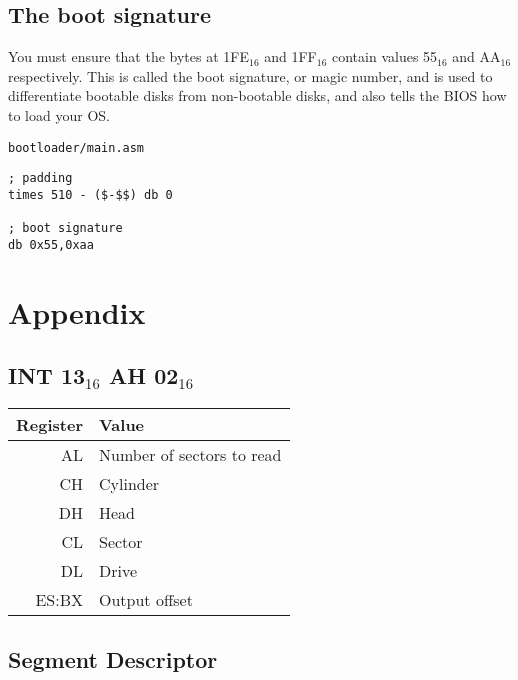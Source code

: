 \documentclass{article}
\begin{document}
\subsection{The boot signature}

You must ensure that the bytes at 1FE$_{16}$ and 1FF$_{16}$
contain values 55$_{16}$ and AA$_{16}$ respectively\cite{55aa}.
This is called the boot signature, or magic number, and is used to differentiate
bootable disks from non-bootable disks, and also tells the BIOS how to load your OS.

\begin{verbatim}
bootloader/main.asm
\end{verbatim}
\begin{verbatim}
; padding
times 510 - ($-$$) db 0

; boot signature
db 0x55,0xaa
\end{verbatim}

\newpage

\section{Appendix}
\appendix

\subsection{INT 13$_{16}$ AH 02$_{16}$}
\label{int 13 ah 02}

\begin{tabular}{|r|l|}
	\hline
	\textbf{Register} & \textbf{Value} \\
	\hline
	AL & Number of sectors to read \\
	\hline
	CH & Cylinder \\
	\hline
	DH & Head \\
	\hline
	CL & Sector \\
	\hline
	DL & Drive \\
	\hline
	ES:BX & Output offset \\
	\hline
\end{tabular}

\subsection{Segment Descriptor}
\label{gdt}
\end{document}
